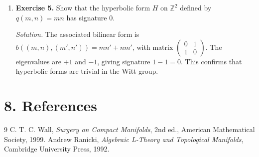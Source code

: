 \begin{enumerate}[leftmargin=*,itemsep=0.9em]
\item \textbf{Exercise 5.} Show that the hyperbolic form $H$ on $\mathbb{Z}^2$ defined by $q(m,n)=mn$ has signature $0$.

\emph{Solution.} The associated bilinear form is $b((m,n),(m',n'))=mn'+nm'$, with matrix $\begin{pmatrix}0&1\\1&0\end{pmatrix}$. The eigenvalues are $+1$ and $-1$, giving signature $1-1=0$. This confirms that hyperbolic forms are trivial in the Witt group.

\end{enumerate}
\section*{8. References}

\begin{thebibliography}{9}
 C. T. C. Wall, \emph{Surgery on Compact Manifolds}, 2nd ed., American Mathematical Society, 1999.
 Andrew Ranicki, \emph{Algebraic L-Theory and Topological Manifolds}, Cambridge University Press, 1992.
\end{thebibliography}